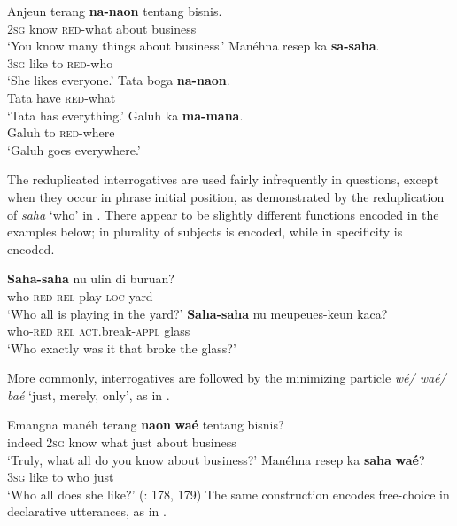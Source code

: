 \documentclass[output=paper]{langscibook}
\begin{document}
 \ea\label{ex:sun:39} 
    \ea\label{ex:sun:39a}
        \gll  Anjeun terang \textbf{na-naon} tentang bisnis.\\ 
              2\textsc{sg} know \textsc{red}{}-what about business\\
        \glt ‘You know many things about business.’
    \ex\label{ex:sun:39b}
        \gll  Manéhna resep ka \textbf{sa-saha}.\\
              3\textsc{sg} like to \textsc{red}{}-who\\
        \glt ‘She likes everyone.’
    \ex\label{ex:sun:39c}
        \gll  Tata boga \textbf{na-naon}.\\
              Tata have \textsc{red}{}-what\\
        \glt ‘Tata has everything.’
    \ex\label{ex:sun:39d}
        \gll  Galuh ka \textbf{ma-mana}.\\
              Galuh to \textsc{red}{}-where\\
        \glt ‘Galuh goes everywhere.’ \citep[172]{Butters2021}
    \z
\z 

The reduplicated interrogatives are used fairly infrequently in questions, except when they occur in phrase initial position, as demonstrated by the reduplication of \textit{saha} ‘who’ in . There appear to be slightly different functions encoded in the examples below; in  plurality of subjects is encoded, while in  specificity is encoded. 

 
\ea\label{ex:sun:40}
    \ea\label{ex:sun:40a}
        \gll  \textbf{Saha-saha} nu ulin di buruan?\\ 
              who-\textsc{red} \textsc{rel} play \textsc{loc} yard\\
        \glt ‘Who all is playing in the yard?’
    \ex\label{ex:sun:40b}
        \gll  \textbf{Saha-saha} nu meupeues-keun kaca?\\
              who-\textsc{red} \textsc{rel} \textsc{act}.break-\textsc{appl} glass\\
        \glt ‘Who exactly was it that broke the glass?’ \citep[173]{Butters2021}
    \z
\z 

 More commonly, interrogatives are followed by the minimizing particle \textit{wé/ waé/ baé} ‘just, merely, only’, as in . 

 
\ea\label{ex:sun:41}
    \ea\label{ex:sun:41a}
        \gll  Emangna manéh terang \textbf{naon} \textbf{waé} tentang bisnis?\\ 
              indeed 2\textsc{sg} know what just about business\\
        \glt ‘Truly, what all do you know about business?’
    \ex\label{ex:sun:41b}
        \gll  Manéhna resep ka \textbf{saha} \textbf{waé}?\\
              3\textsc{sg} like to who just\\
        \glt ‘Who all does she like?’ (\citealt{Butters2021}: 178, 179)
    \z
\z 
The same construction encodes free-choice in declarative utterances, as in . 
\end{document}
